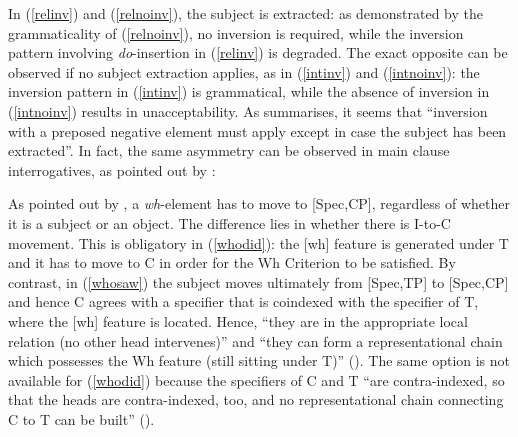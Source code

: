 In (\ref{relinv}) and (\ref{relnoinv}), the subject is extracted: as demonstrated by the grammaticality of (\ref{relnoinv}), no inversion is required, while the inversion pattern involving \textit{do}-insertion in (\ref{relinv}) is degraded. The exact opposite can be observed if no subject extraction applies, as in (\ref{intinv}) and (\ref{intnoinv}): the inversion pattern in (\ref{intinv}) is grammatical, while the absence of inversion in (\ref{intnoinv}) results in unacceptability. As \citet[316]{rizzi1997} summarises, it seems that ``inversion with a preposed negative element must apply except in case the subject has been extracted''. In fact, the same asymmetry can be observed in main clause interrogatives, as pointed out by \citet[317, ex. 106 and 107]{rizzi1997}:

\ea
{}
\z
\z

As pointed out by \citet[317]{rizzi1997}, a \textit{wh}-element has to move to [Spec,CP], regardless of whether it is a subject or an object. The difference lies in whether there is I-to-C movement. This is obligatory in (\ref{whodid}): the [wh] feature is generated under T and it has to move to C in order for the Wh Criterion to be satisfied. By contrast, in (\ref{whosaw}) the subject moves ultimately from [Spec,TP] to [Spec,CP] and hence C agrees with a specifier that is coindexed with the specifier of T, where the [wh] feature is located. Hence, ``they are in the appropriate local relation (no other head intervenes)'' and ``they can form a representational chain which possesses the Wh feature (still sitting under T)'' (\citealt[317]{rizzi1997}). The same option is not available for (\ref{whodid}) because the specifiers of C and T ``are contra-indexed, so that the heads are contra-indexed, too, and no representational chain connecting C to T can be built'' (\citealt[317]{rizzi1997}).


